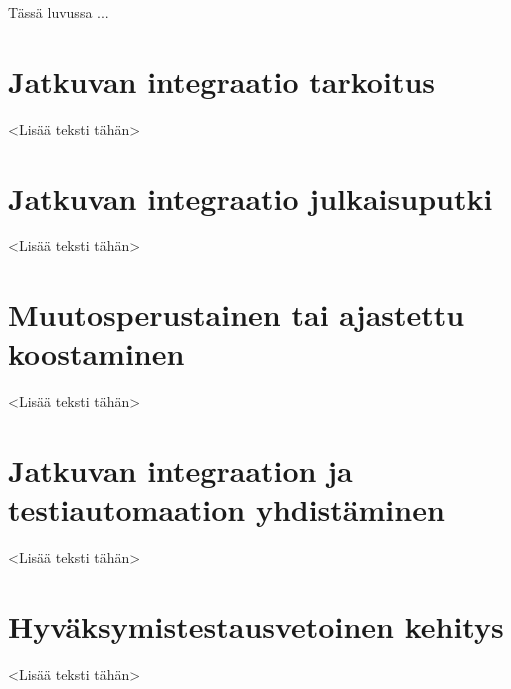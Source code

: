 Tässä luvussa ...

\section{Jatkuvan integraatio tarkoitus}

<Lisää teksti tähän>

\section{Jatkuvan integraatio julkaisuputki}

<Lisää teksti tähän>

\section{Muutosperustainen tai ajastettu koostaminen}

<Lisää teksti tähän>

\section{Jatkuvan integraation ja testiautomaation yhdistäminen}

<Lisää teksti tähän>

\section{Hyväksymistestausvetoinen kehitys}

<Lisää teksti tähän>
